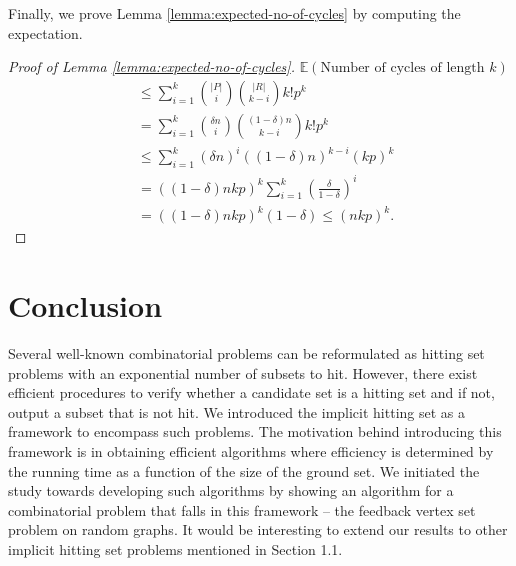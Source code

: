 \documentclass[11pt]{article}
\def\E{\mathbb{E}}
\begin{document}
Finally, we prove Lemma \ref{lemma:expected-no-of-cycles} by computing the expectation.
\begin{proof}[Proof of Lemma \ref{lemma:expected-no-of-cycles}]
$\E(\text{Number of cycles of length $k$})$
\begin{align*}
&\leq \sum_{i=1}^k \binom{|P|}{i}\binom{|R|}{k-i}k!p^k\\
&=\sum_{i=1}^k \binom{\delta n}{i}\binom{(1-\delta)n}{k-i}k!p^k\\
&\leq \sum_{i=1}^k (\delta n)^i((1-\delta)n)^{k-i}(kp)^k
\end{align*}
\begin{align*}
&= ((1-\delta)nkp)^k\sum_{i=1}^k \left(\frac{\delta}{1-\delta}\right)^i\\
&= ((1-\delta)nkp)^k(1-\delta) \leq (nkp)^k.
\end{align*}
\end{proof}

\section{Conclusion}
Several well-known combinatorial problems can be reformulated as hitting set problems with an exponential number of subsets to hit. However, there exist efficient procedures to verify whether a candidate set is a hitting set and if not, output a subset that is not hit. We introduced the implicit hitting set as a framework to encompass such problems. The motivation behind introducing this framework is in obtaining efficient algorithms where efficiency is determined by the running time as a function of the size of the ground set. We initiated the study towards developing such algorithms by showing an algorithm for a combinatorial problem that falls in this framework -- the feedback vertex set problem on random graphs. It would be interesting to extend our results to other implicit hitting set problems mentioned in Section 1.1.




\end{document}
